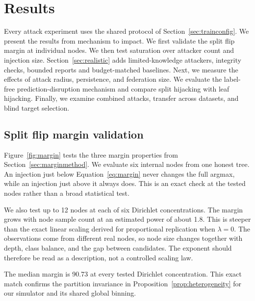 \documentclass[11pt]{article}
\newcommand{\rev}[1]{#1}
\begin{document}
\FloatBarrier

\section{Results}
\label{sec:experiments}

\rev{Every attack experiment uses the shared protocol of Section~\ref{sec:trainconfig}.} We present the results from mechanism to impact. We first validate the split flip margin at individual nodes. We then test saturation over attacker count and injection size. \rev{Section~\ref{sec:realistic} adds limited-knowledge attackers, integrity checks, bounded reports and budget-matched baselines.} Next, we measure the effects of attack radius, persistence, and federation size. We evaluate the label-free \rev{prediction-disruption mechanism} and compare split hijacking with leaf hijacking. Finally, we examine combined attacks, transfer across datasets, and blind target selection.

\subsection{Split flip margin validation}
\label{sec:marginresults}

Figure~\ref{fig:margin} tests the three margin properties from Section~\ref{sec:marginmethod}. We evaluate six internal nodes from one honest tree. An injection just below Equation~\ref{eq:margin} never changes the full argmax, while an injection just above it always does. This is an exact check at the tested nodes rather than a broad statistical test.

We also test up to 12 nodes at each of six Dirichlet concentrations. The margin grows with node sample count at an estimated power of about 1.8. This is steeper than the exact linear scaling derived for proportional replication when $\lambda=0$. The observations come from different real nodes, so node size changes together with depth, class balance, and the gap between candidates. The exponent should therefore be read as a description, not a controlled scaling law.

The median margin is 90.73 at every tested Dirichlet concentration. This exact match confirms the partition invariance in Proposition~\ref{prop:heterogeneity} for our simulator and its shared global binning.
\end{document}
